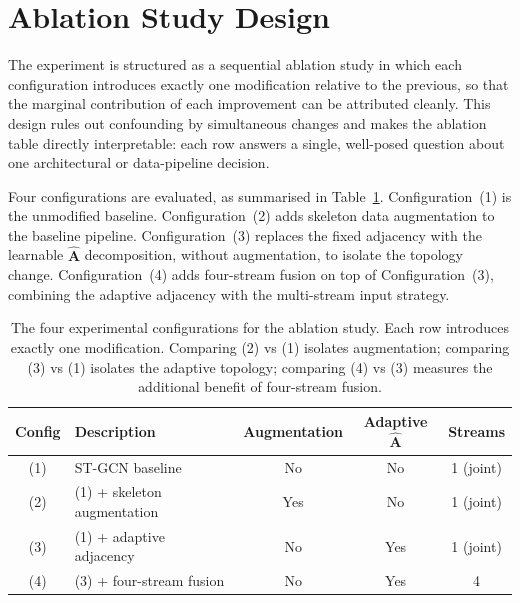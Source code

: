 \section{Ablation Study Design}
\label{sec:ablation-design}

The experiment is structured as a sequential ablation study in which each configuration introduces exactly one modification relative to the previous, so that the marginal contribution of each improvement can be attributed cleanly. This design rules out confounding by simultaneous changes and makes the ablation table directly interpretable: each row answers a single, well-posed question about one architectural or data-pipeline decision.

Four configurations are evaluated, as summarised in Table~\ref{tab:ablation-configs}. Configuration~(1) is the unmodified baseline. Configuration~(2) adds skeleton data augmentation to the baseline pipeline. Configuration~(3) replaces the fixed adjacency with the learnable $\hat{\mathbf{A}}$ decomposition, without augmentation, to isolate the topology change. Configuration~(4) adds four-stream fusion on top of Configuration~(3), combining the adaptive adjacency with the multi-stream input strategy.

\begin{table}[htbp]
\centering
\begin{tabular}{c l c c c}
    \hline
    \textbf{Config} & \textbf{Description} & \textbf{Augmentation} & \textbf{Adaptive $\hat{\mathbf{A}}$} & \textbf{Streams} \\
    \hline
    (1) & ST-GCN baseline              & No  & No  & 1 (joint) \\
    (2) & (1) + skeleton augmentation  & Yes & No  & 1 (joint) \\
    (3) & (1) + adaptive adjacency     & No  & Yes & 1 (joint) \\
    (4) & (3) + four-stream fusion     & No  & Yes & 4          \\
    \hline
\end{tabular}
\caption{The four experimental configurations for the ablation study. Each row introduces exactly one modification. Comparing (2) vs (1) isolates augmentation; comparing (3) vs (1) isolates the adaptive topology; comparing (4) vs (3) measures the additional benefit of four-stream fusion.}
\label{tab:ablation-configs}
\end{table}

